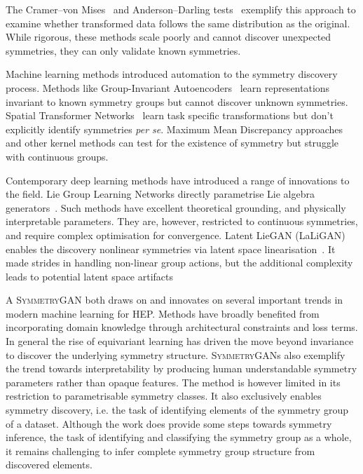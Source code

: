         The Cramer--von Mises~\cite{von_mises_wahrscheinlichkeit_1928, cramer_composition_1928} and Anderson--Darling tests~\cite{anderson_asymptotic_1952} exemplify this approach to examine whether transformed data follows the same distribution as the original.
        While rigorous, these methods scale poorly and cannot discover unexpected symmetries, they can only validate known symmetries.

        Machine learning methods introduced automation to the symmetry discovery process.
        Methods like Group-Invariant Autoencoders~\cite{Hao2023LorentzAutoencoders} learn representations invariant to known symmetry groups but cannot discover unknown symmetries.
        Spatial Transformer Networks~\cite{Jaderberg2015SpatialNetworks} learn task specific transformations but don't explicitly identify symmetries \textit{per se}.
        Maximum Mean Discrepancy approaches~\cite{tolstikhin_minimax_2016} and other kernel methods can test for the existence of symmetry but struggle with continuous groups.

        Contemporary deep learning methods have introduced a range of innovations to the field.
        Lie Group Learning Networks directly parametrise Lie algebra generators~\cite{gabel_learning_2023}.
        Such methods have excellent theoretical grounding, and physically interpretable parameters.
        They are, however, restricted to continuous symmetries, and require complex optimisation for convergence.
        Latent LieGAN (LaLiGAN) enables the discovery nonlinear symmetries via latent space linearisation~\cite{yang_latent_2024}.
        It made strides in handling non-linear group actions, but the additional complexity leads to potential latent space artifacts

        A \textsc{SymmetryGAN} both draws on and innovates on several important trends in modern machine learning for HEP.
        Methods have broadly benefited from incorporating domain knowledge through architectural constraints and loss terms.
        In general the rise of equivariant learning has driven the move beyond invariance to discover the underlying symmetry structure.
        \textsc{SymmetryGAN}s also exemplify the trend towards interpretability by producing human understandable symmetry parameters rather than opaque features.
        The method is however limited in its restriction to parametrisable symmetry classes.
        It also exclusively enables symmetry discovery, i.e. the task of identifying elements of the symmetry group of a dataset.
        Although the work does provide some steps towards symmetry inference, the task of identifying and classifying the symmetry group as a whole, it remains challenging to infer complete symmetry group structure from discovered elements.
        
